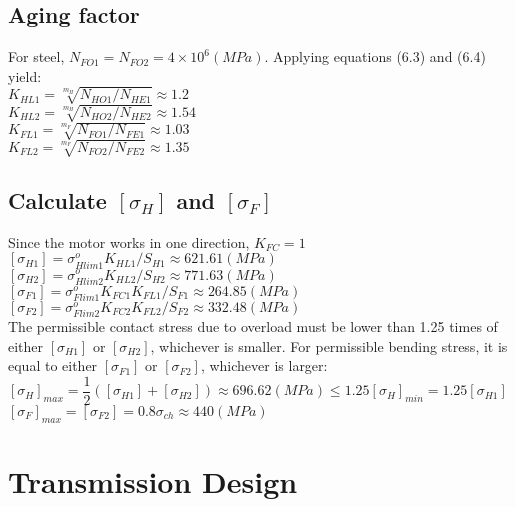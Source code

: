 \subsection{Aging factor}
For steel, $ N_{FO1} = N_{FO2} = 4\times10^6\unit{(MPa)}$. Applying equations (6.3) and (6.4)  yield:\\
$K_{HL1} = \sqrt[m_H]{N_{HO1}/N_{HE1}} \approx 1.2$\\
$ K_{HL2} = \sqrt[m_H]{N_{HO2}/N_{HE2}} \approx 1.54$\\
$ K_{FL1} = \sqrt[m_F]{N_{FO1}/N_{FE1}} \approx 1.03$\\
$ K_{FL2} = \sqrt[m_F]{N_{FO2}/N_{FE2}} \approx 1.35$

\subsection{Calculate $ [\sigma_H] $ and $ [\sigma_F] $}
Since the motor works in one direction, $ K_{FC} = 1$\\
$ [\sigma_{H1}] = \sigma_{Hlim1}^oK_{HL1}/S_{H1} \approx 621.61\unit{(MPa)}$\\
$ [\sigma_{H2}] = \sigma_{Hlim2}^oK_{HL2}/S_{H2} \approx 771.63\unit{(MPa)}$\\
$ [\sigma_{F1}] = \sigma_{Flim1}^oK_{FC1}K_{FL1}/S_{F1} \approx 264.85\unit{(MPa)}$\\
$ [\sigma_{F2}] = \sigma_{Flim2}^oK_{FC2}K_{FL2}/S_{F2} \approx 332.48\unit{(MPa)}$\\
The permissible contact stress due to overload must be lower than 1.25 times of either $ [\sigma_{H1}] $ or $ [\sigma_{H2}] $, whichever is smaller. For permissible bending stress, it is equal to either $ [\sigma_{F1}] $ or $ [\sigma_{F2}] $, whichever is larger:\\
$ [\sigma_H]_{max} = \dfrac{1}{2}\left( [\sigma_{H1}]+[\sigma_{H2}]\right)  \approx 696.62\unit{(MPa)}\leq 1.25[\sigma_H]_{min} = 1.25[\sigma_{H1}]$\\
$ [\sigma_F]_{max} = [\sigma_{F2}] = 0.8\sigma_{ch} \approx 440\unit{(MPa)} $

\section{Transmission Design}

